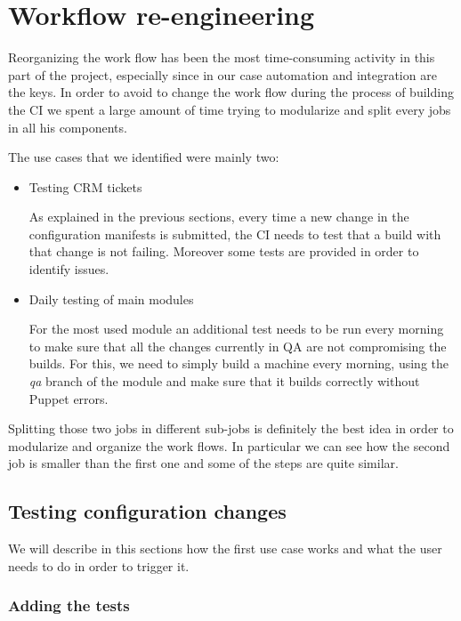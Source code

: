 \section{Workflow re-engineering}

Reorganizing the work flow has been the most time-consuming activity in
this part of the project, especially since in our case automation and
integration are the keys. In order to avoid to change the work flow during
the process of building the CI we spent a large amount of time trying to
modularize and split every jobs in all his components.

The use cases that we identified were mainly two:

\begin{itemize}

  \item Testing CRM tickets

  As explained in the previous sections, every time a new change in the
  configuration manifests is submitted, the CI needs to test that a build
  with that change is not failing. Moreover some tests are provided in
  order to identify issues.
  
  \item Daily testing of main modules

  For the most used module an additional test needs to be run every
  morning to make sure that all the changes currently in QA are not
  compromising the builds. For this, we need to simply build a machine
  every morning, using the \textit{qa} branch of the module and make sure
  that it builds correctly without Puppet errors.
  
\end{itemize}

Splitting those two jobs in different sub-jobs is definitely the best idea
in order to modularize and organize the work flows. In particular we can
see how the second job is smaller than the first one and some of the steps
are quite similar.

\subsection{Testing configuration changes}

We will describe in this sections how the first use case works and what
the user needs to do in order to trigger it.

\subsubsection{Adding the tests}

